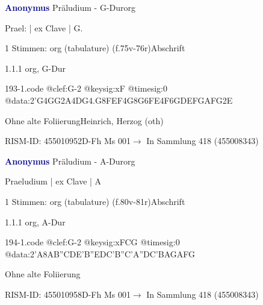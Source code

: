 \documentclass[twocolumn]{book}
\begin{document}
\par \vspace{7pt} \textcolor{darkblue}{\textbf{Anonymus  }}\hfillplus{\textbf{[193]}}\newline Präludium - G-Dur\newline org
\par \begin{itshape}[f.75v, at left:] Prael: | ex Clave | G.\end{itshape} 
\par \textcolor{darkblue}{}  1 Stimmen: org (tabulature)  (f.75v-76r)\newline Abschrift
\par 1.1.1  org, G-Dur  
\begin{filecontents*}{193-1.code}
@clef:G-2
@keysig:xF
@timesig:0
@data:2'G4GG2A4DG4.G8F{EF}4G{8G6FE}4F{6GDEF}{GAFG}2E
\end{filecontents*}
\newline
%
\par Ohne alte Foliierung\newline Heinrich, Herzog  (oth)
\par RISM-ID: 455010952\newline D-Fh  Ms 001\newline $\rightarrow$ In Sammlung 418 (455008343)
      
\par \vspace{7pt} \textcolor{darkblue}{\textbf{Anonymus  }}\hfillplus{\textbf{[194]}}\newline Präludium - A-Dur\newline org
\par \begin{itshape}[f.81r, at left:] Praeludium | ex Clave | A\end{itshape} 
\par \textcolor{darkblue}{}  1 Stimmen: org (tabulature)  (f.80v-81r)\newline Abschrift
\par 1.1.1  org, A-Dur  
\begin{filecontents*}{194-1.code}
@clef:G-2
@keysig:xFCG
@timesig:0
@data:2'A{8AB''CD}{E'B''ED}{C'B''C'A}{''DC'BA}{GAFG}
\end{filecontents*}
\newline
%
\par Ohne alte Foliierung
\par RISM-ID: 455010958\newline D-Fh  Ms 001\newline $\rightarrow$ In Sammlung 418 (455008343)
      
\end{document}
